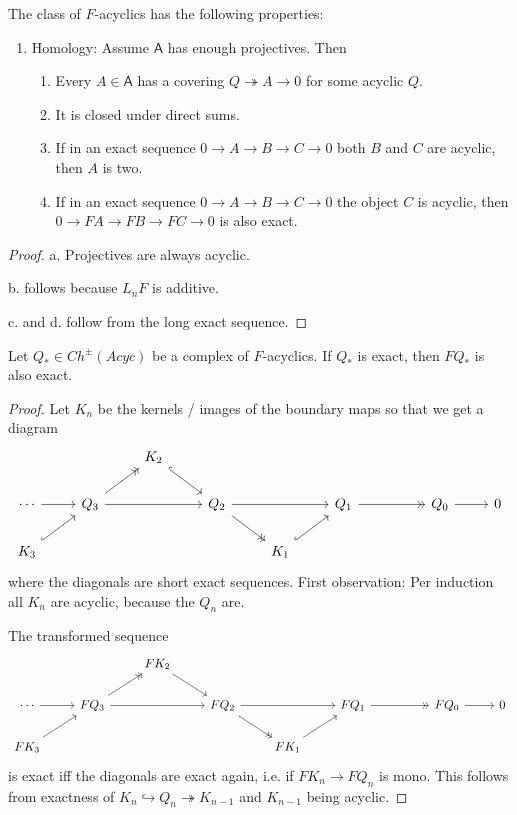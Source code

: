\documentclass[fontsize=11pt,fleqn,a4paper]{scrartcl}
\begin{document}
\begin{lemma}
The class of $F$-acyclics has the following properties:
\begin{enumerate}
\item Homology: Assume $\mathsf{A}$ has enough projectives. Then
\begin{enumerate}
\item Every $A\in\mathsf{A}$ has a covering $Q\twoheadrightarrow A\to 0$ for some acyclic $Q$.
\item It is closed under direct sums.
\item If in an exact sequence $0\to A\to B\to C\to 0$ both $B$ and $C$ are acyclic, then $A$ is two.
\item If in an exact sequence $0\to A\to B\to C\to 0$ the object $C$ is acyclic, then $0\to FA\to FB\to FC\to 0$ is also exact.
\end{enumerate}
\end{enumerate}
\end{lemma}
\begin{proof}
a. Projectives are always acyclic.

b. follows because $L_n F$ is additive.

c. and d. follow from the long exact sequence.
\end{proof}

\begin{lemma}
Let $Q_\ast\in Ch^\pm(Acyc)$ be a complex of $F$-acyclics. If $Q_\ast$ is exact, then $FQ_\ast$ is also exact.
\end{lemma}
\begin{proof}
Let $K_n$ be the kernels / images of the boundary maps so that we get a diagram
\[\begin{tikzcd}
&& K_2 \ar[rd,hook] && && && \\
\cdots \ar[r] & Q_3 \ar[ru,->>] \ar[rr] && Q_2 \ar[dr,->>] \ar[rr] && Q_1 \ar[rr,->>]  && Q_0 \ar[r] & 0 \\
K_3 \ar[ru,hook] && && K_1 \ar[ru,hook] && &&
\end{tikzcd}\]
where the diagonals are short exact sequences. First observation: Per induction all $K_n$ are acyclic, because the $Q_n$ are.

The transformed sequence
\[\begin{tikzcd}
&& FK_2 \ar[rd] && && && \\
\cdots \ar[r] & FQ_3 \ar[ru,->>] \ar[rr] && FQ_2 \ar[dr,->>] \ar[rr] && FQ_1 \ar[rr,->>] && FQ_0 \ar[r] & 0 \\
FK_3 \ar[ru] && && FK_1 \ar[ru] && &&
\end{tikzcd}\]
is exact iff the diagonals are exact again, i.e. if $FK_n \to FQ_n$ is mono. This follows from exactness of $K_n \hookrightarrow Q_n \twoheadrightarrow K_{n-1}$ and $K_{n-1}$ being acyclic.
\end{proof}
\end{document}
